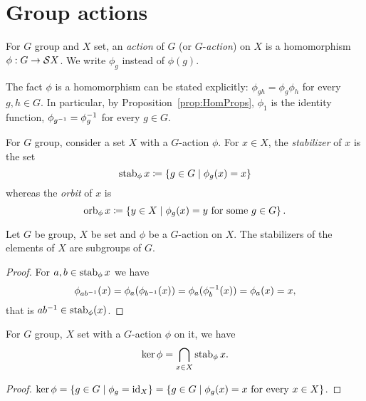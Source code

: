 
\section{Group actions}

\begin{definition}
For \(G\) group and \(X\) set, an {\em action} of \(G\) (or \(G\)-{\em action}) on \(X\) is a homomorphism \(\phi : G \to \mathcal S X\). We write \(\phi_g\) instead of \(\phi(g)\).
\end{definition}

The fact \(\phi\) is a homomorphism can be stated explicitly: \(\phi_{gh} = \phi_g \phi_h\) for every \(g, h \in G\). In particular, by Proposition~\ref{prop:HomProps}, \(\phi_1\) is the identity function, \(\phi_{g^{-1}} = \phi^{-1}_g\) for every \(g \in G\). 

\begin{definition}
For \(G\) group, consider a set \(X\) with a \(G\)-action \(\phi\). For \(x \in X\), the {\em stabilizer} of \(x\) is the set
\[\operatorname{stab}_\phi x \coloneq \left\{g \in G \mid \phi_g(x) = x\right\}\]
whereas the {\em orbit} of \(x\) is
\[\operatorname{orb}_\phi x \coloneq \left\{y \in X \mid \phi_g(x) = y \text{ for some } g \in G\right\}.\]
\end{definition}

\begin{proposition}
Let \(G\) be group, \(X\) be set and \(\phi\) be a \(G\)-action on \(X\). The stabilizers of the elements of \(X\) are subgroups of \(G\).
\end{proposition}

\begin{proof}
For \(a, b \in \operatorname{stab}_\phi x\) we have
\[\phi_{a b^{-1}}(x) = \phi_a (\phi_{b^{-1}} (x)) = \phi_a (\phi^{-1}_b(x)) = \phi_a (x) = x ,\]
that is \(a b^{-1} \in \operatorname{stab}_\phi (x)\).
\end{proof}

\begin{proposition}
For \(G\) group, \(X\) set with a \(G\)-action \(\phi\) on it, we have
\[\ker \phi = \bigcap_{x \in X} \operatorname{stab}_\phi x .\]
\end{proposition}

\begin{proof}
\(\ker \phi = \left\{g \in G \mid \phi_g = \text{id}_X\right\} = \left\{g \in G \mid \phi_g(x) = x \text{ for every } x \in X\right\}\).
\end{proof}

